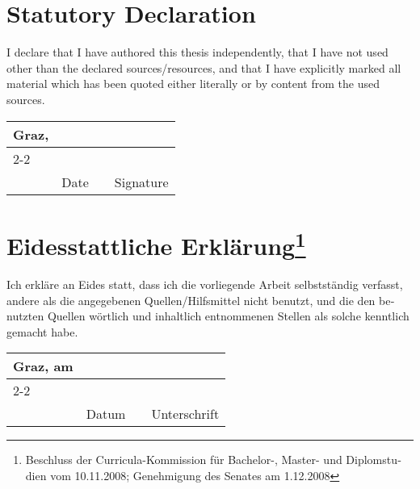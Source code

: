 
\section*{Statutory Declaration}

I declare that I have authored this thesis independently, that I have
not used other than the declared sources/resources, and that I have
explicitly marked all material which has been quoted either literally
or by content from the used sources.

\vfill

\newcommand{\mysignatureblock}[3]{%
  \begin{tabular}{llp{2em}l} 
  #1 & \hspace{5cm}        & & \hspace{6cm} \\\cline{2-2}\cline{4-4}
     &                     & & \\[-3mm]
     & {\footnotesize #2}  & & {\footnotesize #3}
  \end{tabular}
}

\mysignatureblock{Graz,}{Date}{Signature}

\vfill
\vfill
\vfill
\vfill

\section*{Eidesstattliche Erklärung\footnote{%
\foreignlanguage{ngerman}{Beschluss der Curricula-Kommission für Bachelor-, Master- und 
Diplomstudien vom 10.11.2008; 
Genehmigung des Senates am 1.12.2008}}}

\foreignlanguage{ngerman}{%
Ich erkläre an Eides statt, dass ich die
vorliegende Arbeit selbstständig verfasst, andere als die angegebenen
Quellen/Hilfsmittel nicht benutzt, und die den benutzten Quellen
wörtlich und inhaltlich entnommenen Stellen als solche kenntlich
gemacht habe.}

\vfill

\mysignatureblock{Graz, am}{Datum}{Unterschrift}


\newpage
\newpage

